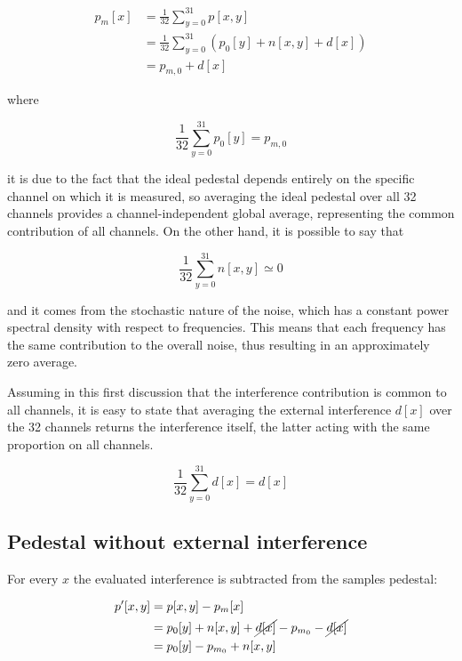 \begin{equation} \label{eq2}
    \begin{split}
        p_m[x] & = \frac{1}{32} \sum_{y=0}^{31} p[x,y] \\
        & = \frac{1}{32} \sum_{y=0}^{31} (p_0[y] + n[x, y] + d[x]) \\
        & = p_{m, 0} + d[x]
    \end{split}
\end{equation}

\noindent
where

\begin{equation}
     \frac{1}{32} \sum_{y=0}^{31} p_0[y] = p_{m, 0}
\end{equation}

\noindent
it is due to the fact that the ideal pedestal depends entirely on the specific channel on which it is measured, so averaging the ideal pedestal over all 32 channels provides a channel-independent global average, representing the common contribution of all channels. On the other hand, it is possible to say that

\begin{equation}
     \frac{1}{32} \sum_{y=0}^{31} n[x,y] \simeq 0
\end{equation}

\noindent
and it comes from the stochastic nature of the noise, which has a constant power spectral density with respect to frequencies. This means that each frequency has the same contribution to the overall noise, thus resulting in an approximately zero average.

\par
Assuming in this first discussion that the interference contribution is common to all channels, it is easy to state that averaging the external interference $d[x]$ over the 32 channels returns the interference itself, the latter acting with the same proportion on all channels.

\begin{equation}
     \frac{1}{32} \sum_{y=0}^{31} d[x] = d[x]
\end{equation}

\subsection{Pedestal without external interference}

For every $x$ the evaluated interference is subtracted from the samples pedestal:

\begin{equation}
    \begin{split}
        p'[x,y] & = p[x,y] - p_m[x] \\
        & = p_0[y] + n[x,y] + \cancel{d[x]} - p_{m_0} - \cancel{d[x]} \\
        & = p_0[y] - p_{m_0} + n[x,y]
    \end{split}
\end{equation}

